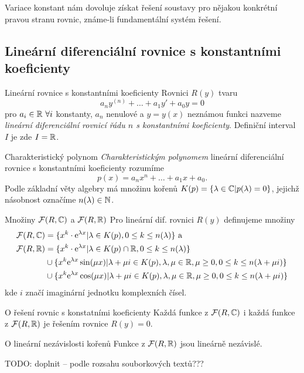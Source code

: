 \begin{poznamka}
Variace konstant nám dovoluje získat řešení soustavy pro nějakou konkrétní pravou stranu rovnic, známe-li fundamentální systém řešení.
\end{poznamka}


\subsection{Lineární diferenciální rovnice s konstantními koeficienty}

\begin{definiceN}{Lineární rovnice s konstantními koeficienty}
Rovnici $R(y)$ tvaru 
$$a_ny^{(n)}+\dots+a_1y'+a_0y=0$$
pro $a_i\in\mathbb{R}\ \forall i$ konstanty, $a_n$ nenulové a $y=y(x)$ neznámou funkci nazveme \emph{lineární diferenciální rovnicí řádu $n$ s konstantními koeficienty}. Definiční interval $I$ je zde $I=\mathbb{R}$.
\end{definiceN}

\begin{definiceN}{Charakteristický polynom}
\emph{Charakteristickým polynomem} lineární diferenciální rovnice s konstantními koeficienty rozumíme 
$$p(x)=a_n x^n+\dots+a_1 x+a_0\text{.}$$
Podle základní věty algebry má množinu kořenů $K(p)=\{\lambda\in\mathbb{C} | p(\lambda)=0\}$, jejichž násobnost označíme $n(\lambda)\in\mathbb{N}$.
\end{definiceN}

\begin{definiceN}{Množiny $\mathcal{F}(R,\mathbb{C})$ a $\mathcal{F}(R,\mathbb{R})$}
Pro lineární dif. rovnici $R(y)$ definujeme množiny
\begin{align*}
    \mathcal{F}(R,\mathbb{C})&=\{x^k\cdot \mathrm{e}^{\lambda x}|\lambda\in K(p), 0\leq k\leq n(\lambda)\}\text{ a }\\
	\mathcal{F}(R,\mathbb{R})&=\{x^k\cdot \mathrm{e}^{\lambda x}|\lambda\in K(p)\cap\mathbb{R}, 0\leq k\leq n(\lambda)\}\\
	&\cup\{x^k \mathrm{e}^{\lambda x}\sin(\mu x)|\lambda +\mu i\in K(p),\lambda,\mu\in\mathbb{R},\mu\geq 0,0\leq k\leq n(\lambda+\mu i)\}\\
	&\cup\{x^k \mathrm{e}^{\lambda x}\cos(\mu x)|\lambda +\mu i\in K(p),\lambda,\mu\in\mathbb{R},\mu\geq 0,0\leq k\leq n(\lambda+\mu i)\}
\end{align*}
\noindent kde $i$ značí imaginární jednotku komplexních čísel.
\end{definiceN}

\begin{vetaN}{O řešení rovnic s konstatními koeficienty}
Každá funkce z $\mathcal{F}(R,\mathbb{C})$ i každá funkce z $\mathcal{F}(R,\mathbb{R})$ je řešením rovnice $R(y)=0$.
\end{vetaN}

\begin{vetaN}{O lineární nezávislosti kořenů}
Funkce z $\mathcal{F}(R,\mathbb{R})$ jsou lineárně nezávislé.
\end{vetaN}

TODO: doplnit -- podle rozsahu souborkových textů???
